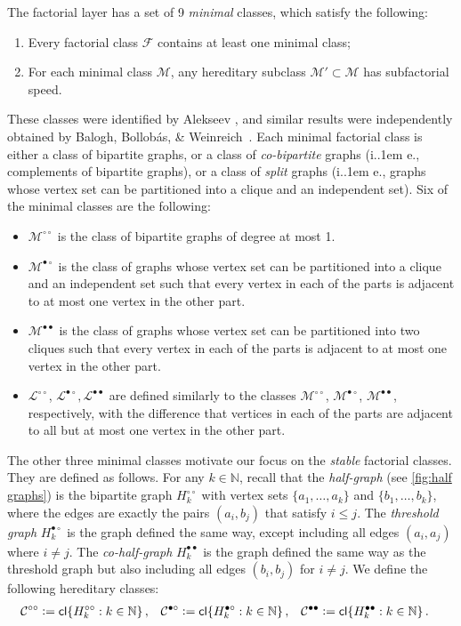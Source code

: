 \documentclass{theoretics}
\makeatletter
\newcommand{\define}{\vcentcolon=}
\newcommand{\cC}{\ensuremath{\mathcal{C}}}
\newcommand{\cF}{\ensuremath{\mathcal{F}}}
\newcommand{\cL}{\ensuremath{\mathcal{L}}}
\newcommand{\cM}{\ensuremath{\mathcal{M}}}
\newcommand{\bN}{\ensuremath{\mathbb{N}}}
\newcommand*\ie{i.\kern.1em e.\@\xspace} %
\newcommand{\cl}{\mathsf{cl}}
\newcommand{\dcirc}{{\circ\circ}}
\newcommand{\bcirc}{{\bullet\circ}}
\newcommand{\dbullet}{{\bullet\bullet}}
\makeatother
\begin{document}
The factorial layer has a set of 9 \emph{minimal} classes, which satisfy the following:
\begin{enumerate}
\item Every factorial class $\cF$ contains at least one minimal class;
\item For each minimal class $\cM$, any  hereditary subclass $\cM' \subset \cM$ has subfactorial
speed.
\end{enumerate}
These classes were identified by Alekseev \cite{Ale97}, and similar results were independently
obtained by Balogh, Bollob{\'a}s, \& Weinreich~\cite{BBW00}.  Each minimal factorial class is either
a class of bipartite graphs, or a class of \emph{co-bipartite} graphs (\ie, complements of bipartite
graphs), or a class of \emph{split} graphs (\ie, graphs whose vertex set can be partitioned into a
clique and an independent set).  Six of the minimal classes are the following:
\begin{itemize}
\item $\cM^{\dcirc}$ is the class of bipartite graphs of degree at most 1. 
\item $\cM^\bcirc$ is the class of graphs whose vertex set can be partitioned into a clique and an independent set
such that every vertex in each of the parts is adjacent to at most one vertex in the other part.
\item $\cM^\dbullet$ is the class of graphs whose vertex set can be partitioned into two cliques
such that every vertex in each of the parts is adjacent to at most one vertex in the other part.
\item $\cL^{\dcirc}$, $\cL^\bcirc, \cL^\dbullet$ are defined similarly to the classes 
$\cM^{\dcirc}$, $\cM^\bcirc$, $\cM^\dbullet$, respectively, with the difference that vertices in
each of the parts are adjacent to all but at most one vertex in the other part.
\end{itemize}
The other three minimal classes motivate our focus on the \emph{stable} factorial classes. They
are defined as follows.
For any $k \in \bN$, recall that the \emph{half-graph} (see \cref{fig:half graphs}) is the bipartite graph $H^{\circ\circ}_k$ with vertex
sets $\{a_1, \dotsc, a_k\}$ and $\{b_1, \dotsc, b_k\}$, where the edges are exactly the pairs
$(a_i,b_j)$ that satisfy $i \leq j$. The \emph{threshold graph} $H^{\bullet\circ}_k$ is the graph
defined the same way, except including all edges $(a_i,a_j)$ where $i \neq j$.  The
\emph{co-half-graph} $H^{\bullet\bullet}_k$ is the graph defined the same way as the threshold graph
but also including all edges $(b_i,b_j)$ for $i \neq j$.  We define the following hereditary
classes:
\begin{align*}
  \cC^\dcirc &\define \cl\{ H_k^\dcirc : k \in \bN \} \,,
  &\cC^\bcirc &\define \cl\{ H_k^\bcirc : k \in \bN \} \,,
  &\cC^\dbullet &\define \cl\{ H_k^\dbullet : k \in \bN \} \,.
\end{align*}
\end{document}
